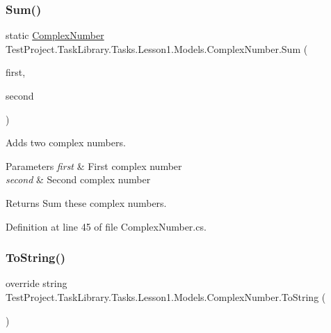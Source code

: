 \subsubsection{\texorpdfstring{Sum()}{Sum()}}
{\footnotesize\ttfamily static \mbox{\hyperlink{class_test_project_1_1_task_library_1_1_tasks_1_1_lesson1_1_1_models_1_1_complex_number}{Complex\+Number}} Test\+Project.\+Task\+Library.\+Tasks.\+Lesson1.\+Models.\+Complex\+Number.\+Sum (\begin{DoxyParamCaption}\item[{\mbox{\hyperlink{class_test_project_1_1_task_library_1_1_tasks_1_1_lesson1_1_1_models_1_1_complex_number}{Complex\+Number}}}]{first,  }\item[{\mbox{\hyperlink{class_test_project_1_1_task_library_1_1_tasks_1_1_lesson1_1_1_models_1_1_complex_number}{Complex\+Number}}}]{second }\end{DoxyParamCaption})\hspace{0.3cm}{\ttfamily [static]}}



Adds two complex numbers. 


\begin{DoxyParams}{Parameters}
{\em first} & First complex number\\
\hline
{\em second} & Second complex number\\
\hline
\end{DoxyParams}
\begin{DoxyReturn}{Returns}
Sum these complex numbers.
\end{DoxyReturn}


Definition at line 45 of file Complex\+Number.\+cs.

\mbox{\label{class_test_project_1_1_task_library_1_1_tasks_1_1_lesson1_1_1_models_1_1_complex_number_ae8bd421b10f98e78aa71000ba30b0ea6}} 
\subsubsection{\texorpdfstring{ToString()}{ToString()}}
{\footnotesize\ttfamily override string Test\+Project.\+Task\+Library.\+Tasks.\+Lesson1.\+Models.\+Complex\+Number.\+To\+String (\begin{DoxyParamCaption}{ }\end{DoxyParamCaption})}



